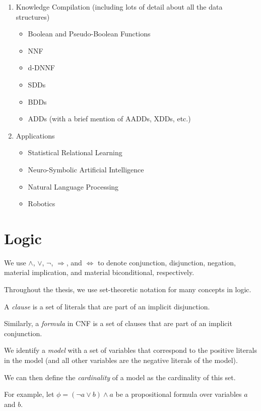 \begin{enumerate}
\begin{itemize}
\begin{itemize}
    \end{itemize}
  \end{itemize}
\item Knowledge Compilation (including lots of detail about all the data structures)
  \begin{itemize}
  \item Boolean and Pseudo-Boolean Functions
  \item NNF
  \item d-DNNF
  \item SDDs
  \item BDDs
  \item ADDs (with a brief mention of AADDs, XDDs, etc.)
  \end{itemize}
\item Applications
  \begin{itemize}
  \item Statistical Relational Learning
  \item Neuro-Symbolic Artificial Intelligence
  \item Natural Language Processing
  \item Robotics
  \end{itemize}
\end{enumerate}

\clearpage %
\section{Logic}

We use $\land$, $\lor$, $\neg$, $\Rightarrow$, and $\Leftrightarrow$ to denote conjunction, disjunction, negation, material implication, and material biconditional, respectively.

Throughout the thesis, we use set-theoretic notation for many concepts in logic.

A \emph{clause} is a set of literals that are part of an implicit disjunction.

Similarly, a \emph{formula} in CNF is a set of clauses that are part of an implicit conjunction.

We identify a \emph{model} with a set of variables that correspond to the positive literals in the model (and all other variables are the negative literals of the model).

We can then define the \emph{cardinality} of a model as the cardinality of this set.

For example, let $\phi = (\neg a \lor b) \land a$ be a propositional formula over variables $a$ and $b$.

